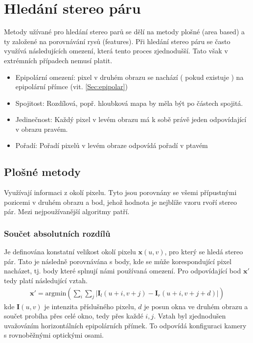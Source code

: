 \documentclass[twoside]{ctuthesis}
\newcommand{\tl}[1]{$\mathbf{#1}$}
\begin{document}
\section{Hledání stereo páru}
Metody užívané pro hledání stereo parů se dělí na metody plošné (area based) a ty založené na porovnávání rysů (features). Při hledání stereo páru se často využívá následujících omezení, která tento proces zjednodušší. Tato však v extrémních případech nemusí platit.
\begin{itemize}
    \item Epipolární omezení: pixel v druhém obrazu se nachází ( pokud existuje ) na epipolární přímce (vit. \ref{Sec:epipolar})
    \item Spojitost: Rozdílová, popř. hloubková mapa by měla být po částech spojitá.
    \item Jedinečnost: Každý pixel v levém obrazu má k sobě právě jeden odpovídající v obrazu pravém. 
    \item Pořadí: Pořadí pixelů v levém obraze odpovídá pořadí v ptavém
\end{itemize}

\subsection{Plošné metody}
Využívají informaci z okolí pixelu. Tyto jsou porovnány se všemi přípustnými pozicemi v druhém obrazu a bod, jehož hodnota je nejblíže vzoru rvoří stereo pár. Mezi nejpoužívanější algoritmy patří.

\subsubsection{Součet absolutních rozdílů}
Je definována konstatní velikost okolí pixelu $\mathbf{x}(u,v)$, pro který se hledá stereo pár. Tato je následně porovnávána s body, kde se může korespondující pixel nacházet, tj. body které splnují námi používaná omezení. Pro odpovídající bod \tl{x'} tedy platí následující vztah. 
\begin{align}
    \mathbf{x'} = \text{argmin}\left( \displaystyle\sum_i \displaystyle\sum_j |\mathbf{I}_l(u+i,v+j) - \mathbf{I}_r(u+i, v+j + d)| \right)
\end{align}
kde $\mathbf{I}(u,v)$ je intenzita příslušného pixelu, $d$ je posun okna ve druhém obrazu a součet probíha přes celé okno, tedy přes každé $i,j$. Vztah byl zjednodušen uvažováním horizontálních epipolárních přímek. To odpovídá konfiguraci kamery s rovnoběžnými optickými osami.
\end{document}
